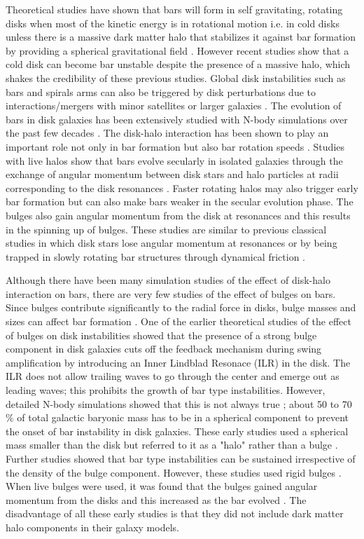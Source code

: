 \documentclass[a4paper,fleqn,usenatbib,useAMS]{mnras}
\begin{document}
 
Theoretical studies have shown that bars will form in self gravitating, rotating disks when most of the kinetic energy is in rotational motion i.e. in cold disks \citep{12a,12b} unless there is a massive dark matter halo that stabilizes it against bar formation by providing a spherical gravitational field \citep{24}. However recent studies \citep{14a,15a1} show that a cold disk can become bar unstable despite the presence of  a massive halo, which shakes the credibility of these previous studies. Global disk instabilities such as bars and spirals arms can also be triggered by disk perturbations due to interactions/mergers with minor satellites or larger galaxies \citep{7,8,9,10,11,12}. The evolution of bars in disk galaxies has been extensively studied with N-body simulations over the past few decades \citep{13,13a,14,14a,15,15a1,15a,29,17,18}. The disk-halo interaction has been shown to play an important role not only in bar formation but also bar rotation speeds \citep{2007MNRAS.375..460W,0004-637X-543-2-704}. Studies with live halos show that bars evolve secularly in isolated galaxies through the exchange of angular momentum between disk stars and halo particles at radii corresponding to the disk resonances \citep{18}. Faster rotating halos may also trigger early bar formation \citep{18} but can also make bars weaker in the secular evolution phase. The bulges also gain angular momentum from the disk at resonances and this results in the spinning up of bulges\citep{51}. These studies are similar to previous classical studies in which disk stars lose angular momentum at resonances \citep{19,20} or by being trapped in slowly rotating bar structures through dynamical friction \citep{21}. 

Although there have been many simulation studies of the effect of disk-halo interaction on bars, there are very few studies of the effect of bulges on bars. Since bulges contribute significantly to the radial force in disks, bulge masses and sizes can affect bar formation \citep{45}. One of the earlier theoretical studies of the effect of bulges on disk instabilities \citep{44} showed that the presence of a strong bulge component in disk galaxies cuts off the feedback mechanism during swing amplification \citep{43} by introducing an Inner Lindblad Resonace (ILR) in the disk. The ILR does not allow trailing waves to go through the center and emerge out as leading waves; this prohibits the growth of bar type instabilities. However, detailed N-body simulations showed that this is not always true \citep{46}; about 50 to 70 $\%$ of total galactic baryonic mass has to be in a spherical component to prevent the onset of bar instability in disk galaxies. These early studies used a spherical mass smaller than the disk but referred to it as a "halo" rather than a bulge \citep{46}. Further studies \citep{47} showed that bar type instabilities can be sustained irrespective of the density of the bulge component. However, these studies used rigid bulges \citep{46,47}. When live bulges were used, it was found that the bulges gained angular momentum from the disks and this increased as the bar evolved \citep{46}. The disadvantage of all these early studies is that they did not include dark matter halo components in their galaxy models.
\end{document}

